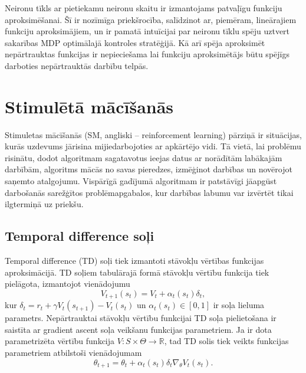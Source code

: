 \documentclass[a0,landscape]{a0poster}
\numberwithin{equation}{section}
\theoremstyle{definition}
\theoremstyle{plain}
\begin{document}
\begin{multicols}{4}
Neironu tīkls ar pietiekamu neironu skaitu ir izmantojams patvaļīgu funkciju aproksimēšanai.
Šī ir nozīmīga priekšrocība, salīdzinot ar, piemēram, lineārajiem funkciju aproksimājiem, un ir pamatā intuīcijai par neironu tīklu spēju uztvert sakarības MDP optimālajā kontroles stratēģijā.
Kā arī spēja aproksimēt nepārtrauktas funkcijas ir nepieciešama lai funkciju aproksimētājs būtu spējīgs darboties nepārtrauktās darbību telpās.

\section*{Stimulētā mācīšanās}
Stimuletas mācīšanās (SM, angliski -- reinforcement learning) pārziņā ir situācijas, kurās uzdevums jārisina mijiedarbojoties ar apkārtējo vidi. 
Tā vietā, lai problēmu risinātu, dodot algoritmam sagatavotus ieejas datus ar norādītām labākajām darbībām, algoritms mācās no savas pieredzes, izmēģinot darbības un novērojot saņemto atalgojumu.
Vispārīgā gadījumā algoritmam ir patstāvīgi jāapgūst darbošanās sarežģītos problēmapgabalos, kur darbības labumu var izvērtēt tikai ilgtermiņā uz priekšu.

\subsection*{Temporal difference soļi} \label{chap:td}
Temporal difference (TD) soļi tiek izmantoti stāvokļu vērtības funkcijas aproksimācijā.
TD soļiem tabulārajā formā stāvokļu vērtību funkcija tiek pielāgota, izmantojot vienādojumu
\[
	V_{t+1}(s_t) = V_t + \alpha_t(s_t) \delta_t,
\]
kur $\delta_t = r_{t} + \gamma V_t(s_{t + 1}) - V_t(s_t)$ un $\alpha_t(s_t) \in [0,1]$ ir soļa lieluma parametrs.
Nepārtrauktai stāvokļu vērtību funkcijai TD soļa pielietošana ir saistīta ar gradient ascent soļa veikšanu funkcijas parametriem.
Ja ir dota parametrizēta vērtību funkcija $V:S \times \Theta \rightarrow \mathbb{R}$, tad TD solis tiek veikts funkcijas parametriem atbilstoši vienādojumam
\[
	\theta_{t+1} = \theta_t + \alpha_t(s_t) \delta_t \nabla_\theta V_t(s_t).
\]


\end{multicols}
\end{document}
